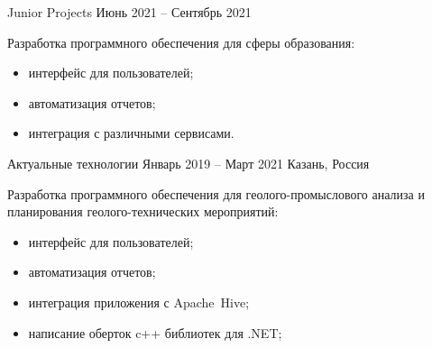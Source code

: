 \documentclass[10pt,a4paper,ragged2e,withhyper]{altacv}
\begin{document}

\makecvheader



\begin{paracol}{2}



{Junior Projects}
{Июнь 2021 -- Сентябрь 2021}

Разработка программного обеспечения для сферы образования:

\begin{itemize}

  \item интерфейс для пользователей;
  \smallskip

  \item автоматизация отчетов;
  \smallskip

  \item интеграция с различными сервисами.

\end{itemize}

\divider

{Актуальные технологии}
{Январь 2019 -- Март 2021}
{Казань, Россия}

Разработка программного обеспечения для геолого-промыслового анализа и планирования геолого-технических мероприятий:

\begin{itemize}

  \item интерфейс для пользователей;
  \smallskip

  \item автоматизация отчетов;
  \smallskip

  \item интеграция приложения с Apache~Hive;
  \smallskip

  \item написание оберток c++ библиотек для .NET;
  \smallskip


\end{itemize}
\end{paracol}
\end{document}
